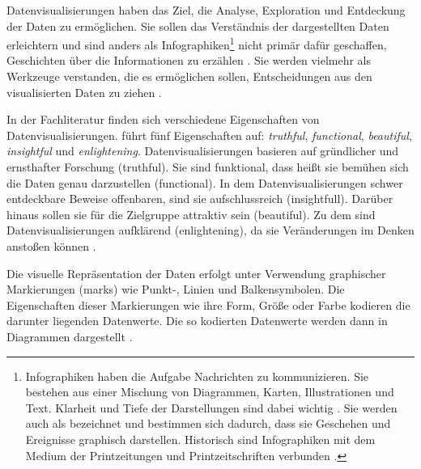 Datenvisualisierungen haben das Ziel, die Analyse, Exploration und Entdeckung der Daten zu ermöglichen. Sie sollen das Verständnis der dargestellten Daten erleichtern
und sind anders als Infographiken\footnote{Infographiken haben die Aufgabe Nachrichten zu kommunizieren.
Sie bestehen aus einer Mischung von Diagrammen, Karten, Illustrationen und Text. Klarheit und Tiefe der Darstellungen sind dabei wichtig
\cite[vgl.][31]{cairo_truthful_2016}. Sie werden auch als 
bezeichnet und bestimmen sich dadurch, dass sie Geschehen und Ereignisse graphisch darstellen. 
Historisch sind Infographiken mit dem Medium der Printzeitungen und Printzeitschriften verbunden \cite[vgl.][27]{kirk_data_2019}.}
nicht primär dafür geschaffen, Geschichten über die Informationen zu erzählen \cite[vgl.][20 ff.]{kirk_data_2019}. 
Sie werden vielmehr als Werkzeuge verstanden, die es ermöglichen sollen, Entscheidungen aus den visualisierten Daten zu ziehen \cite[vgl.][31]{cairo_truthful_2016}. %

In der Fachliteratur finden sich verschiedene Eigenschaften von Datenvisualisierungen. 
führt fünf Eigenschaften auf: \textit{truthful}, \textit{functional}, \textit{beautiful}, \textit{insightful} und \textit{enlightening}.
Datenvisualisierungen basieren auf gründlicher und ernsthafter Forschung (truthful). Sie sind funktional, dass heißt
sie bemühen sich die Daten genau darzustellen (functional). In dem Datenvisualisierungen schwer entdeckbare Beweise offenbaren, 
sind sie aufschlussreich (insightfull). Darüber hinaus sollen sie für die Zielgruppe attraktiv sein (beautiful).
Zu dem sind Datenvisualisierungen aufklärend (enlightening), da sie Veränderungen im Denken anstoßen können \cite[vgl.][45]{cairo_truthful_2016}. 

Die visuelle Repräsentation der Daten erfolgt unter Verwendung graphischer Markierungen (marks) wie Punkt-, 
Linien und Balkensymbolen. Die Eigenschaften dieser Markierungen wie ihre Form, Größe oder Farbe kodieren die
darunter liegenden Datenwerte. Die so kodierten Datenwerte werden dann in Diagrammen dargestellt \cite[vgl.][135 ff.]{kirk_data_2019}.

